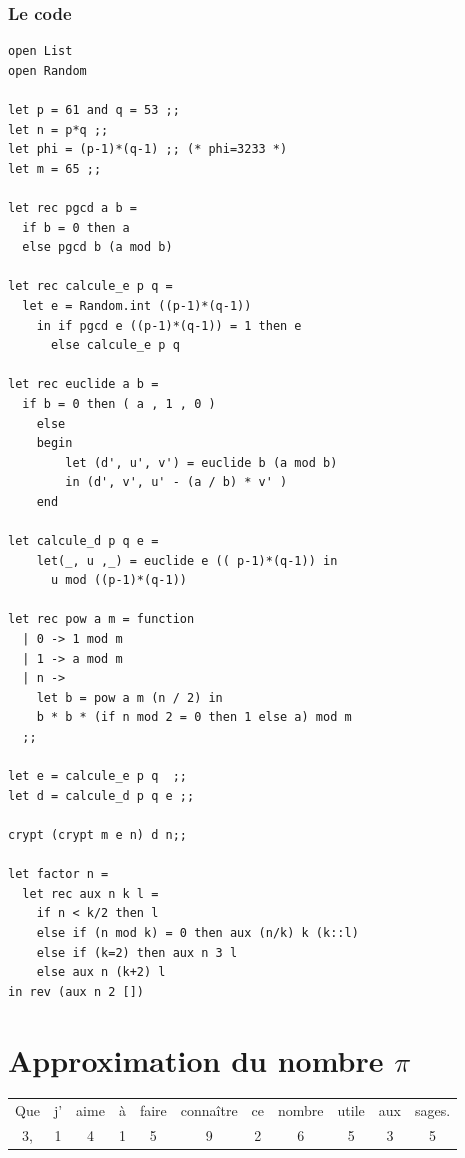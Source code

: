 \documentclass[11pt]{book}
\begin{document}
 \subsubsection{Le code}
 \begin{Verbatim}
open List
open Random 

let p = 61 and q = 53 ;;
let n = p*q ;;
let phi = (p-1)*(q-1) ;; (* phi=3233 *)
let m = 65 ;;

let rec pgcd a b =
  if b = 0 then a 
  else pgcd b (a mod b)

let rec calcule_e p q =
  let e = Random.int ((p-1)*(q-1))
    in if pgcd e ((p-1)*(q-1)) = 1 then e
      else calcule_e p q  

let rec euclide a b = 
  if b = 0 then ( a , 1 , 0 ) 
    else 
    begin
        let (d', u', v') = euclide b (a mod b)
        in (d', v', u' - (a / b) * v' )
    end

let calcule_d p q e =
    let(_, u ,_) = euclide e (( p-1)*(q-1)) in
      u mod ((p-1)*(q-1))

let rec pow a m = function
  | 0 -> 1 mod m
  | 1 -> a mod m
  | n -> 
    let b = pow a m (n / 2) in
    b * b * (if n mod 2 = 0 then 1 else a) mod m
  ;;    

let e = calcule_e p q  ;;
let d = calcule_d p q e ;;

crypt (crypt m e n) d n;;

let factor n =
  let rec aux n k l =
    if n < k/2 then l
    else if (n mod k) = 0 then aux (n/k) k (k::l)
    else if (k=2) then aux n 3 l 
    else aux n (k+2) l
in rev (aux n 2 [])
\end{Verbatim}

 \section{Approximation du nombre $\pi$ }

\begin{center}
	\begin{tabular}{ccccccccccc}
		Que & j'& aime & à & faire & connaître & ce & nombre & utile & aux & sages. \\
		3,   & 1 &  4   & 1 &  5    &  9        & 2  &  6     &  5    & 3   & 5 \\ 
	\end{tabular}	
\end{center}
\end{document}
